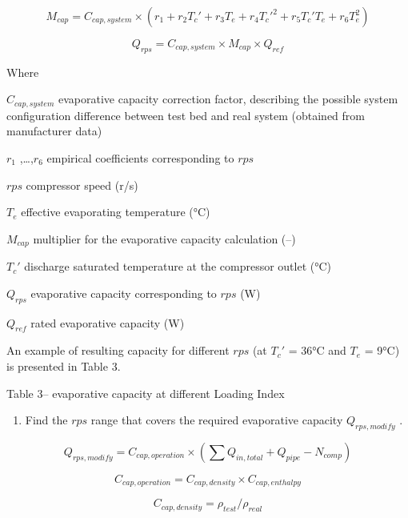 \begin{equation}
  M_{cap} = C_{cap,system}\times(r_1+r_2{T_c}'+r_3T_e+r_4{T_c}'^2+r_5{T_c}'T_e+r_6T_e^2)
\end{equation}

\begin{equation}
  Q_{rps} = C_{cap,system} \times M_{cap} \times Q_{ref}
\end{equation}

Where

\(C_{cap,system}\) evaporative capacity correction factor, describing the possible system configuration difference between test bed and real system (obtained from manufacturer data)

\(r_1\) ,\ldots{},\(r_6\) empirical coefficients corresponding to \(rps\)

\(rps\) compressor speed (r/s)

\(T_e\) effective evaporating temperature (°C)

\(M_{cap}\) multiplier for the evaporative capacity calculation (--)

\({T_c}'\) discharge saturated temperature at the compressor outlet (°C)

\(Q_{rps}\) evaporative capacity corresponding to \(rps\) (W)

\(Q_{ref}\) rated evaporative capacity (W)

An example of resulting capacity for different \(rps\) (at \({T_c}'\) = 36°C and \(T_e\) = 9°C) is presented in Table 3.

Table 3-- evaporative capacity at different Loading Index



\begin{enumerate}
\def\labelenumi{\alph{enumi}.}
\setcounter{enumi}{1}
\tightlist
\item
  Find the \(rps\) range that covers the required evaporative capacity \(Q_{rps,modify}\) .
\end{enumerate}

\begin{equation}
Q_{rps,modify} = C_{cap,operation}\times(\sum{Q_{in,total}}+Q_{pipe}-N_{comp})
\end{equation}

\begin{equation}
C_{cap,operation} = C_{cap,density}\times{C_{cap,enthalpy}}
\end{equation}

\begin{equation}
C_{cap,density} = \rho_{test}/\rho_{real}
\end{equation}

